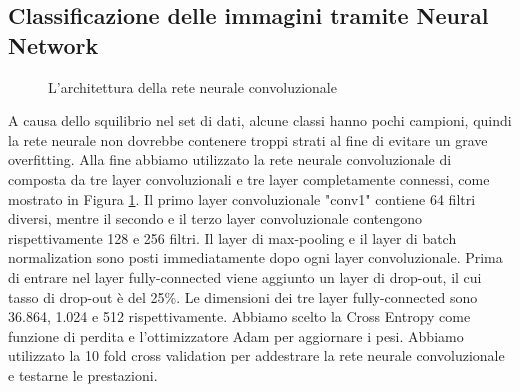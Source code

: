 \subsection{Classificazione delle immagini tramite Neural Network}
\label{methology_sec:ClassNN}
\begin{figure}[h!]
		\centering
		
  		\caption{L'architettura della rete neurale convoluzionale}
        \label{fig:cnn}
\end{figure}
A causa dello squilibrio nel set di dati, alcune classi hanno pochi campioni, quindi la rete neurale non dovrebbe
contenere troppi strati al fine di evitare un grave overfitting. 
Alla fine abbiamo utilizzato la rete neurale convoluzionale di \cite{lyu2018deep} composta da tre layer convoluzionali 
e tre layer completamente connessi, come mostrato in Figura \ref{fig:cnn}. Il primo layer convoluzionale "conv1"
contiene 64 filtri diversi, mentre il secondo e il terzo layer convoluzionale contengono rispettivamente 128 e 256
filtri. Il layer di max-pooling e il layer di batch normalization sono posti immediatamente dopo
ogni layer convoluzionale. Prima di entrare nel layer fully-connected viene aggiunto un layer di drop-out, il cui 
tasso di drop-out è del 25\%. Le dimensioni dei tre layer fully-connected sono 36.864, 1.024 e 512 rispettivamente.
Abbiamo scelto la Cross Entropy come funzione di perdita e l'ottimizzatore Adam per aggiornare i pesi. 
Abbiamo utilizzato la 10 fold cross validation per addestrare la rete neurale convoluzionale e testarne le
prestazioni. \newline

